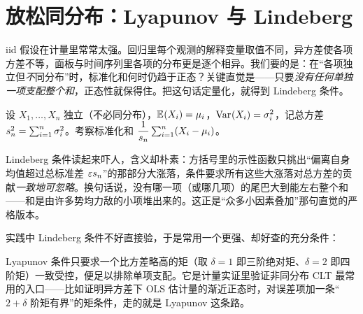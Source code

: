 \section{放松同分布：Lyapunov 与 Lindeberg}
\label{sec:clt-noniid}

iid 假设在计量里常常太强。回归里每个观测的解释变量取值不同，异方差使各项方差不等，面板与时间序列里各项的分布更是逐个相异。我们要的是：在``各项独立但\emph{不}同分布''时，标准化和何时仍趋于正态？关键直觉是——只要\emph{没有任何单独一项支配整个和}，正态性就保得住。把这句话定量化，就得到 Lindeberg 条件。

设 $X_1,\dots,X_n$ 独立（不必同分布），$\mathbb{E}_{}\!\left(X_i\right)=\mu_i$，$\operatorname{Var}_{}\!\left(X_i\right)=\sigma_i^2$，记总方差 $s_n^2=\sum_{i=1}^n\sigma_i^2$。考察标准化和 $\dfrac{1}{s_n}\sum_{i=1}^n(X_i-\mu_i)$。


Lindeberg 条件读起来吓人，含义却朴素：方括号里的示性函数只挑出``偏离自身均值超过总标准差 $\varepsilon s_n$''的那部分大涨落，条件要求所有这些大涨落对总方差的贡献\emph{一致地可忽略}。换句话说，没有哪一项（或哪几项）的尾巴大到能左右整个和——和是由许多势均力敌的小项堆出来的。这正是``众多小因素叠加''那句直觉的严格版本。

实践中 Lindeberg 条件不好直接验，于是常用一个更强、却好查的充分条件：


Lyapunov 条件只要求一个比方差略高的矩（取 $\delta=1$ 即三阶绝对矩、$\delta=2$ 即四阶矩）一致受控，便足以排除单项支配。它是计量实证里验证非同分布 CLT 最常用的入口——比如证明异方差下 OLS 估计量的渐近正态时，对误差项加一条``$2+\delta$ 阶矩有界''的矩条件，走的就是 Lyapunov 这条路。


